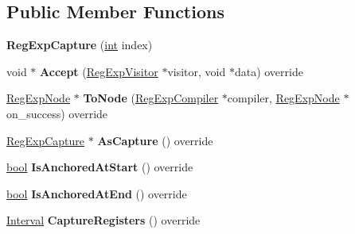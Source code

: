 \subsection*{Public Member Functions}
\begin{DoxyCompactItemize}
\item 
\mbox{\label{classv8_1_1internal_1_1RegExpCapture_afb97ab193d05e2df6fb2459415c1d29d}} 
{\bfseries Reg\+Exp\+Capture} (\mbox{\hyperlink{classint}{int}} index)
\item 
\mbox{\label{classv8_1_1internal_1_1RegExpCapture_aa61fd0faa9e8f640d53395458dc7d7e0}} 
void $\ast$ {\bfseries Accept} (\mbox{\hyperlink{classv8_1_1internal_1_1RegExpVisitor}{Reg\+Exp\+Visitor}} $\ast$visitor, void $\ast$data) override
\item 
\mbox{\label{classv8_1_1internal_1_1RegExpCapture_a26a9a394c68c2e2fe719aaef018323ff}} 
\mbox{\hyperlink{classv8_1_1internal_1_1RegExpNode}{Reg\+Exp\+Node}} $\ast$ {\bfseries To\+Node} (\mbox{\hyperlink{classv8_1_1internal_1_1RegExpCompiler}{Reg\+Exp\+Compiler}} $\ast$compiler, \mbox{\hyperlink{classv8_1_1internal_1_1RegExpNode}{Reg\+Exp\+Node}} $\ast$on\+\_\+success) override
\item 
\mbox{\label{classv8_1_1internal_1_1RegExpCapture_aee644c2539caab9a272cb327f27bfa42}} 
\mbox{\hyperlink{classv8_1_1internal_1_1RegExpCapture}{Reg\+Exp\+Capture}} $\ast$ {\bfseries As\+Capture} () override
\item 
\mbox{\label{classv8_1_1internal_1_1RegExpCapture_a54e106635865b5c37ba9cfda2b737b6b}} 
\mbox{\hyperlink{classbool}{bool}} {\bfseries Is\+Anchored\+At\+Start} () override
\item 
\mbox{\label{classv8_1_1internal_1_1RegExpCapture_ab4ed4aeff92a5deda7411f9eb224a001}} 
\mbox{\hyperlink{classbool}{bool}} {\bfseries Is\+Anchored\+At\+End} () override
\item 
\mbox{\label{classv8_1_1internal_1_1RegExpCapture_a7a410515528b3dd6d5ce4140712fca2c}} 
\mbox{\hyperlink{classv8_1_1internal_1_1Interval}{Interval}} {\bfseries Capture\+Registers} () override

\end{DoxyCompactItemize}
